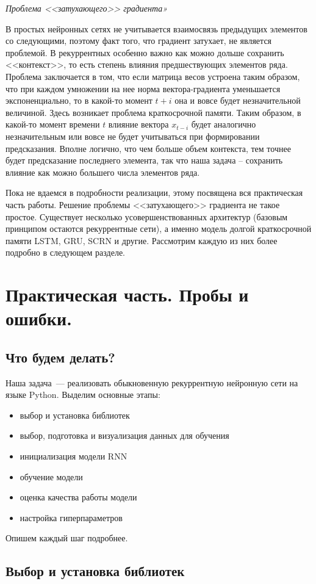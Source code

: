 \documentclass[12pt, a4paper]{article}
\begin{document}
\textit{Проблема <<затухающего>> градиента»}

В простых нейронных сетях не учитывается взаимосвязь предыдущих элементов со следующими, поэтому факт того, что градиент затухает, не является проблемой. В рекуррентных особенно важно как можно дольше сохранить <<контекст>>, то есть степень влияния предшествующих элементов ряда. Проблема заключается в том, что если матрица весов устроена таким образом, что при каждом умножении на нее норма вектора-градиента уменьшается экспоненциально, то в какой-то момент $t+i$ она и вовсе будет незначительной величиной. Здесь возникает проблема краткосрочной памяти.
Таким образом, в какой-то момент времени $t$ влияние вектора $x_{t-i}$ будет аналогично незначительным или вовсе не будет учитываться при формировании предсказания. Вполне логично, что чем больше объем контекста, тем точнее будет предсказание последнего элемента, так что наша задача – сохранить влияние как можно большего числа элементов ряда.

Пока не вдаемся в подробности реализации, этому посвящена вся практическая часть работы.
Решение проблемы <<затухающего>> градиента не такое простое. Существует несколько усовершенствованных архитектур (базовым принципом остаются рекуррентные сети), а именно модель долгой краткосрочной памяти LSTM, GRU, SCRN и другие. Рассмотрим каждую из них более подробно в следующем разделе.

\section{Практическая часть. Пробы и ошибки.}
\subsection{Что будем делать?}
Наша задача~--- реализовать обыкновенную рекуррентную нейронную сети на языке Python. Выделим основные этапы:
\begin{itemize}
	\item выбор и установка библиотек
	\item выбор, подготовка и визуализация данных для обучения
	\item инициализация модели RNN
	\item обучение модели
	\item оценка качества работы модели
	\item настройка гиперпараметров
\end{itemize}
Опишем каждый шаг подробнее.
\subsection{Выбор и установка библиотек}
\end{document}
